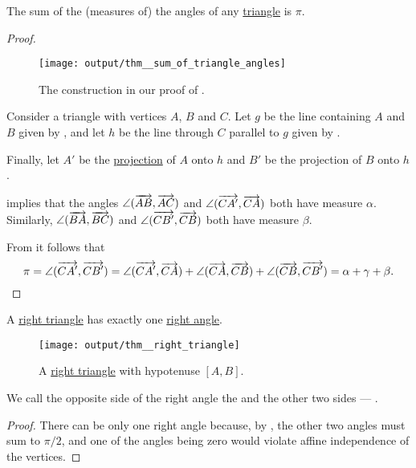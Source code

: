 \begin{proposition}\label{thm:sum_of_triangle_angles}
  The sum of the (measures of) the angles of any \hyperref[def:triangle]{triangle} is \( \pi \).
\end{proposition}
\begin{proof}
  \begin{figure}[!ht]
    \centering
    \texttt{[image: output/thm\_\_sum\_of\_triangle\_angles]}
    \caption{The construction in our proof of .}\label{fig:thm:sum_of_triangle_angles}
  \end{figure}

  Consider a triangle with vertices \( A \), \( B \) and \( C \). Let \( g \) be the line containing \( A \) and \( B \) given by , and let \( h \) be the line through \( C \) parallel to \( g \) given by .

  Finally, let \( A' \) be the \hyperref[def:orthogonal_projection]{projection} of \( A \) onto \( h \) and \( B' \) be the projection of \( B \) onto \( h \).

   implies that the angles \( \angle(\overrightarrow{AB}, \overrightarrow{AC}) \) and \( \angle(\overrightarrow{CA'}, \overrightarrow{CA}) \) both have measure \( \alpha \). Similarly, \( \angle(\overrightarrow{BA}, \overrightarrow{BC}) \) and \( \angle(\overrightarrow{CB'}, \overrightarrow{CB}) \) both have measure \( \beta \).

  From  it follows that
  \begin{equation*}
    \pi
    =
    \angle(\overrightarrow{CA'}, \overrightarrow{CB'})
    =
    \angle(\overrightarrow{CA'}, \overrightarrow{CA}) + \angle(\overrightarrow{CA}, \overrightarrow{CB}) + \angle(\overrightarrow{CB}, \overrightarrow{CB'})
    =
    \alpha + \gamma + \beta.
  \end{equation*}
\end{proof}

\begin{corollary}\label{thm:right_triangle}
  A \hyperref[def:triangle/right]{right triangle} has exactly one \hyperref[def:angle/measure/right]{right angle}.

  \begin{figure}[!ht]
    \centering
    \texttt{[image: output/thm\_\_right\_triangle]}
    \caption{A \hyperref[def:triangle/right]{right triangle} with hypotenuse \( [A, B] \).}\label{fig:thm:right_triangle}
  \end{figure}

  We call the opposite side of the right angle the  and the other two sides --- .
\end{corollary}
\begin{proof}
  There can be only one right angle because, by , the other two angles must sum to \( \pi / 2 \), and one of the angles being zero would violate affine independence of the vertices.
\end{proof}

